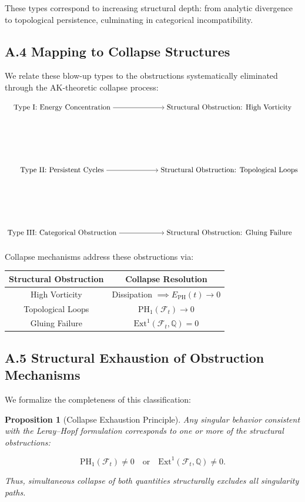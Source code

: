 \documentclass[11pt]{article}
\newtheorem{proposition}[theorem]{Proposition}
\begin{document}
These types correspond to increasing structural depth: from analytic divergence to topological persistence, culminating in categorical incompatibility.

\subsection*{A.4 Mapping to Collapse Structures}

We relate these blow-up types to the obstructions systematically eliminated through the AK-theoretic collapse process:

\[
\begin{tikzpicture}[node distance=3cm, auto]
  \node (type1) {Type I: Energy Concentration};
  \node (type2) [below of=type1] {Type II: Persistent Cycles};
  \node (type3) [below of=type2] {Type III: Categorical Obstruction};

  \node (obs1) [right of=type1, xshift=5cm] {Structural Obstruction: High Vorticity};
  \node (obs2) [right of=type2, xshift=5cm] {Structural Obstruction: Topological Loops};
  \node (obs3) [right of=type3, xshift=5cm] {Structural Obstruction: Gluing Failure};

  \draw[->] (type1) -- (obs1);
  \draw[->] (type2) -- (obs2);
  \draw[->] (type3) -- (obs3);
\end{tikzpicture}
\]

Collapse mechanisms address these obstructions via:

\begin{center}
\begin{tabular}{|c|c|}
\hline
Structural Obstruction & Collapse Resolution \\
\hline
High Vorticity & Dissipation \( \implies E_{\mathrm{PH}}(t) \to 0 \) \\
Topological Loops & \( \mathrm{PH}_1(\mathcal{F}_t) \to 0 \) \\
Gluing Failure & \( \mathrm{Ext}^1(\mathcal{F}_t, \mathbb{Q}) = 0 \) \\
\hline
\end{tabular}
\end{center}

\subsection*{A.5 Structural Exhaustion of Obstruction Mechanisms}

We formalize the completeness of this classification:

\begin{proposition}[Collapse Exhaustion Principle]
Any singular behavior consistent with the Leray–Hopf formulation corresponds to one or more of the structural obstructions:

\[
\mathrm{PH}_1(\mathcal{F}_t) \neq 0 \quad \text{or} \quad \mathrm{Ext}^1(\mathcal{F}_t, \mathbb{Q}) \neq 0.
\]

Thus, simultaneous collapse of both quantities structurally excludes all singularity paths.
\end{proposition}
\end{document}
